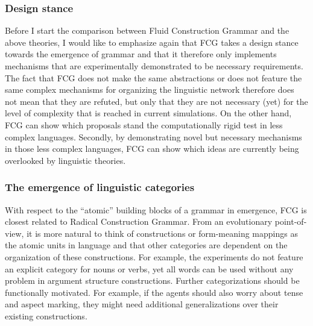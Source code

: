 \subsubsection{Design stance} 
Before I start the comparison between Fluid Construction Grammar and the above theories, I would like to emphasize again that FCG takes a design stance towards the emergence of grammar and that it therefore only implements mechanisms that are experimentally demonstrated to be necessary requirements. The fact that FCG does not make the same abstractions or does not feature the same complex mechanisms for organizing the linguistic network therefore does not mean that they are refuted, but only that they are not necessary (yet) for the level of complexity that is reached in current simulations. On the other hand, FCG can show which proposals stand the computationally rigid test in less complex languages. Secondly, by demonstrating novel but necessary mechanisms in those less complex languages, FCG can show which ideas are currently being overlooked by linguistic theories.


\subsubsection{The emergence of linguistic categories}
With respect to the ``atomic'' building blocks of a grammar in emergence, FCG is closest related to Radical Construction Grammar. From an evolutionary point-of-view, it is more natural to think of constructions or form-meaning mappings as the atomic units in language and that other categories are dependent on the organization of these constructions. For example, the experiments do not feature an explicit category for nouns or verbs, yet all words can be used without any problem in argument structure constructions. Further categorizations should be functionally motivated. For example, if the agents should also worry about tense and aspect marking, they might need additional generalizations over their existing constructions.

